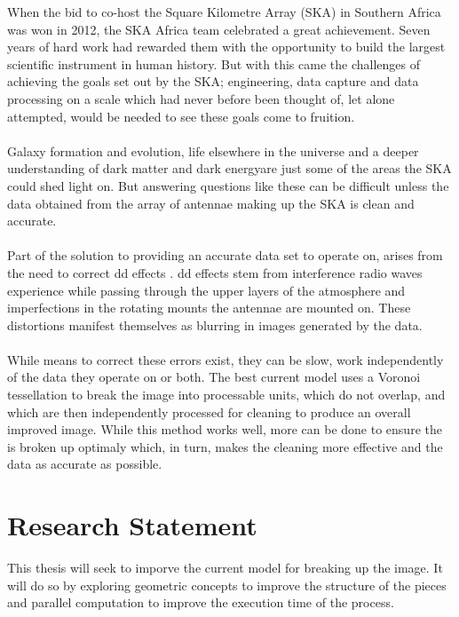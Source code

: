 When the bid to co-host the Square Kilometre Array (SKA) in Southern Africa was won in 2012, the SKA Africa team celebrated a great achievement. Seven years of hard work had rewarded them with the opportunity to build the largest scientific instrument in human history. But with this came the challenges of achieving the goals set out by the SKA; engineering, data capture and data processing on a scale which had never before been thought of, let alone attempted, would be needed to see these goals come to fruition.
\\
\\
Galaxy formation and evolution, life elsewhere in the universe and a deeper understanding of dark matter and dark energy\footnotemark are just some of the areas the SKA could shed light on. But answering questions like these can be difficult unless the data obtained from the array of antennae making up the SKA is clean and accurate.
\\
\\
Part of the solution to providing an accurate data set to operate on, arises from the need to correct \gls{dd} effects \citep{smirnov2011revisiting}. \gls{dd} effects stem from interference radio waves experience while passing through the upper layers of the atmosphere and imperfections in the rotating mounts the antennae are mounted on. These distortions manifest themselves as blurring in images generated by the data.
\\
\\
While means to correct these errors exist, they can be slow, work independently of the data they operate on or both. The best current model uses a Voronoi tessellation \citep{okabe2009spatial} to break the image into processable units, which do not overlap, and which are then independently processed for cleaning to produce an overall improved image. While this method works well, more can be done to ensure the is broken up optimaly which, in turn, makes the cleaning more effective and the data as accurate as possible.
\section{Research Statement}
This thesis will seek to imporve the current model for breaking up the image. It will do so by exploring geometric concepts to improve the structure of the pieces and parallel computation to improve the execution time of the process.

